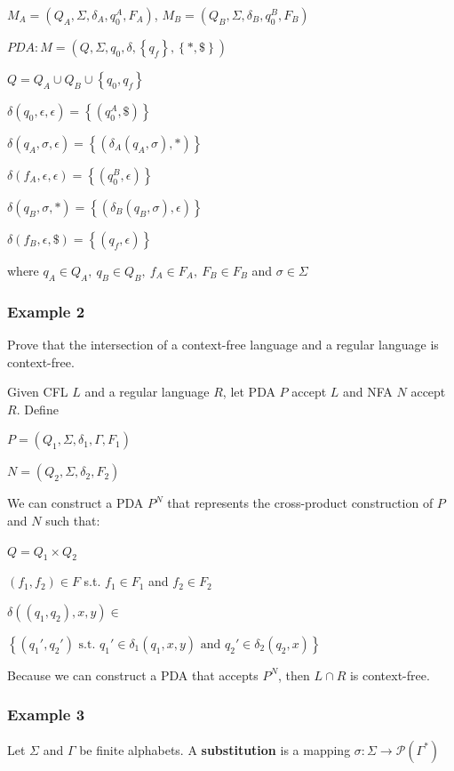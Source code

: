 $M_A = \left(Q_A, \Sigma, \delta_A, q_0^A, F_A\right)$,
$M_B = \left(Q_B, \Sigma, \delta_B, q_0^B, F_B\right)$

$PDA: M = \left(Q, \Sigma, q_0, \delta, \left\{q_f\right\}, \left\{\ast, \$\right\}\right)$

$Q = Q_A \cup Q_B \cup \left\{q_0, q_f\right\}$

$\delta(q_0, \epsilon, \epsilon) = \left\{\left(q_0^A, \$\right)\right\}$

$\delta(q_A, \sigma, \epsilon) = \left\{\left(\delta_A(q_A, \sigma), \ast\right)\right\}$

$\delta(f_A, \epsilon, \epsilon) = \left\{\left(q_0^B, \epsilon\right)\right\}$

$\delta(q_B, \sigma, \ast) = \left\{\left(\delta_B(q_B, \sigma), \epsilon\right)\right\}$

$\delta(f_B, \epsilon, \$) = \left\{\left(q_f, \epsilon\right)\right\}$

where $q_A \in Q_A,~ q_B \in Q_B,~ f_A \in F_A,~ F_B \in F_B$ and
$\sigma\in\Sigma$
\vspace{1mm}
\subsubsection{Example 2}
Prove that the intersection of a context-free language and a regular
language is context-free.

Given CFL $L$ and a regular language $R$, let PDA $P$ accept $L$ and NFA
$N$ accept $R$. Define

$P = (Q_1, \Sigma, \delta_1, \Gamma, F_1)$

$N = (Q_2, \Sigma, \delta_2, F_2)$

We can construct a PDA $P^N$ that represents the cross-product
construction of $P$ and $N$ such that:

$Q = Q_1 \times Q_2$

$(f_1, f_2) \in F$ s.t. $f_1 \in F_1$ and $f_2 \in F_2$

$\delta\left(\left(q_{1},q_{2}\right),x,y\right) \in $

\hspace{10mm}$\left\{\left(q_{1}',q_{2}'\right)\textrm{ s.t. }q_{1}'\in\delta_{1}\left(q_{1},x,y\right)\textrm{ and }q_{2}'\in\delta_{2}\left(q_{2},x\right)\right\}$

Because we can construct a PDA that accepts $P^N$, then $L\cap R$ is
context-free.
\subsubsection{Example 3}
Let $\Sigma$ and $\Gamma$ be finite alphabets. A \textbf{substitution}
is a mapping
$\sigma: \Sigma \to \mathcal{P}(\Gamma^*)$

